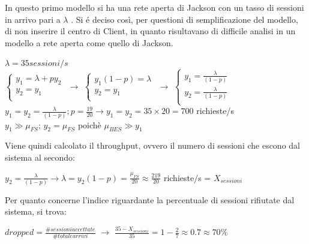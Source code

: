 In questo primo modello si ha una rete aperta di Jackson con un tasso di 
sessioni in arrivo pari a $\lambda$ . Si \'e deciso cos\`i, per questioni di 
semplificazione del modello, di non inserire il centro di Client, in quanto
risultavano di difficile analisi in un modello a rete aperta come quello di 
Jackson.
\begin{center}
$\lambda = 35 sessioni/s$
\\ \vspace{0.5cm}
$\begin{cases} 
y_{1} = \lambda + p y_{2} \\ y_{2} = y_{1} \\
\end{cases}$  $\rightarrow$
$\begin{cases} 
y_{1}(1-p) = \lambda \\ y_{2} = y_{1} \\
\end{cases}$ $\rightarrow$
$\begin{cases} 
y_{1} =\frac{ \lambda}{(1- p)} \\ y_{2} =\frac{\lambda}{(1-p)} \\
\end{cases}$
\\ \vspace{0.5cm}
$y_{1} = y_{2} = \frac{\lambda}{(1-p)} ; p=\frac{19}{20} \rightarrow 
y_{1} = y_{2} = 35\times20 = 700$ richieste/s
\\ \vspace{0.5cm}
$y_{1}\gg\mu_{FS}$; $y_{2}=\mu_{FS}$ poich\`e $\mu_{BES}\gg y_{1}$
\end{center}Viene quindi calcolato il throughput, ovvero il numero di sessioni che escono 
dal sistema al secondo:
\begin{center}
$y_{2} =\frac{\lambda}{(1-p)} \rightarrow \lambda=y_{2}(1-p)=\frac{\mu_{FS}}{20}\approx\frac{219}{20}$ richieste/s = $X_{sessioni}$
\end{center}
Per quanto concerne l'indice riguardante la percentuale di sessioni rifiutate 
dal sistema, si trova:
\begin{center}
 $dropped=\frac{\#sessioni accettate}{\#totale arrivi}$ $\rightarrow$ 
$\frac{35-X_{sessioni}}{35} = 1-\frac{2}{7}\approx 0.7 \approx 70\%$
\end{center}
